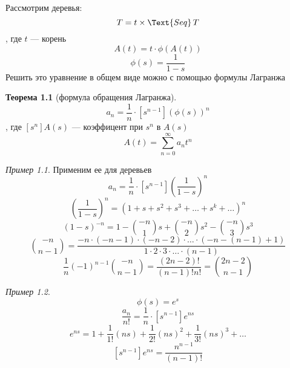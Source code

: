 \documentclass[oneside]{book}
\theoremstyle{plain}
\theoremstyle{remark}
\newtheorem*{examp}{Пример}
\theoremstyle{definition}
\newtheorem{theorem}{Теорема}[section]
\begin{document}
\chapter{}
\label{sec:org186075f}
\newcommand{\stirlF}[2]{\left[\begin{matrix} #1 \\ #2 \end{matrix}\right]}
\newcommand{\stirlS}[2]{\left\{\begin{matrix} #1 \\ #2 \end{matrix}\right\}}
\newcommand{\Set}{\text{Set}\,}
\newcommand{\Seq}{\text{Seq}\,}
\newcommand{\Cyc}{\text{Cyc}\,}


Рассмотрим деревья:
\[ T = t \times \Text{Seq}\,T \]
, где \(t\) --- корень
\[ A(t) = t\cdot \phi(A(t)) \]
\[ \phi(s) = \frac{1}{1 - s} \]
Решить это уравнение в общем виде можно с помощью формулы Лагранжа
\begin{theorem}[формула обращения Лагранжа]
\[ a_n = \frac{1}{n}\cdot[s^{n - 1}](\phi(s))^n \], где \([s^{n}]A(s)\) --- коэффицент при \(s^n\) в \(A(s)\)
\[ A(t) = \sum_{n = 0}^\infty a_n t^n \]
\end{theorem}
\begin{examp}
Применим ее для деревьев
\[ a_n = \frac{1}{n}\cdot[s^{n - 1}]\left(\frac{1}{1 - s}\right)^n \]
\[ \left(\frac{1}{1 - s}\right)^n = (1 + s + s^2 + s^3 + \dots + s^k + \dots)^n \]
\[ (1 - s)^{-n} = 1 - \binom{-n}{1} s + \binom{-n}{2}s^2 - \binom{-n}{3}s^3 \]
\[ \binom{-n}{n - 1} = \frac{-n\cdot(-n - 1)\cdot(-n - 2)\cdot\dots\cdot(-n - (n - 1) + 1)}{1\cdot 2 \cdot 3 \cdot \dots \cdot (n - 1)} \]
\[ \frac{1}{n}(-1)^{n - 1}\binom{-n}{n - 1} = \frac{(2n - 2)!}{(n - 1)!n!} = \binom{2n - 2}{n - 1} \]
\end{examp}
\begin{examp}
\[ \phi(s) = e^s \]
\[ \frac{a_n}{n!} = \frac{1}{n}\cdot[s^{n- 1}] e^{ns} \]
\[ e^{ns} = 1 + \frac{1}{1!}(ns) + \frac{1}{2!}(ns)^2 + \frac{1}{3!}(ns)^3 + \dots \]
\[ [s^{n - 1}]e^{ns} = \frac{n^{n - 1}}{(n - 1)!} \]
\end{examp}
\end{document}
